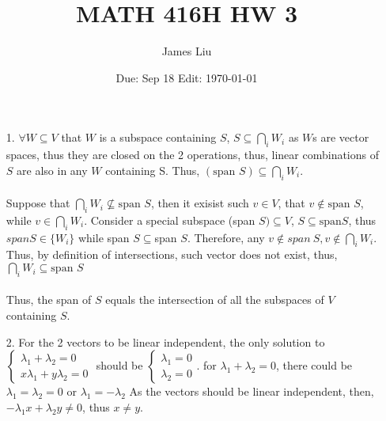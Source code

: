 \documentclass{article}
\date{Due: Sep 18 Edit: \today}
\title{MATH 416H HW 3}
\author{James Liu}
\begin{document}
\maketitle

\begin{itemize}
    \item [1.] \(\forall W \subseteq V\) that \(W\) is a subspace containing \(S\),  \(S\subseteq \bigcap_i W_i\) as \(W\)s are vector spaces, thus they are closed on the 2 operations, thus, linear combinations of \(S\) are also in any \(W\) containing S.
    Thus, \((\text{span }S)\subseteq\bigcap_i W_i\). \\ \\
    Suppose that  \(\bigcap_iW_i\not\subseteq\text{span }S\), then it exisist such \(v\in V\), that \(v\notin \text{span }S\), while \(v\in \bigcap_iW_i\). Consider a special subspace (span \(S)\subseteq V\), \(S\subseteq \text{span} S\), thus \(span S \in \{W_i\}\) while span \(S\subseteq\)span \(S\). Therefore, any \(v\notin span\ S, v\notin \bigcap_iW_i\). Thus, by definition of intersections, such vector does not exist, thus, \(\bigcap_iW_i\subseteq\text{span }S\)
    \\ \\
    Thus, the span of \(S\) equals the intersection of all
    the subspaces of \( V\) containing \(S\).
    \item [2.] For the 2 vectors to be linear independent, the only solution to \(\left\{\begin{matrix}
    \lambda_1+\lambda_2 = 0\\
    x\lambda_1+y\lambda_2 = 0
    \end{matrix}\right.\) 
    should be \(\left\{\begin{matrix}
        \lambda_1=0\\\lambda_2 = 0
    \end{matrix}\right.\).
    for \(\lambda_1+\lambda_2 = 0\), there could be \(\lambda_1=\lambda_2=0\) or \(\lambda_1=-\lambda_2\) As the vectors should  be linear independent, then, \(-\lambda_1x+\lambda_2y\neq0\), thus \(x\neq y\).\\


\end{itemize}
\end{document}
